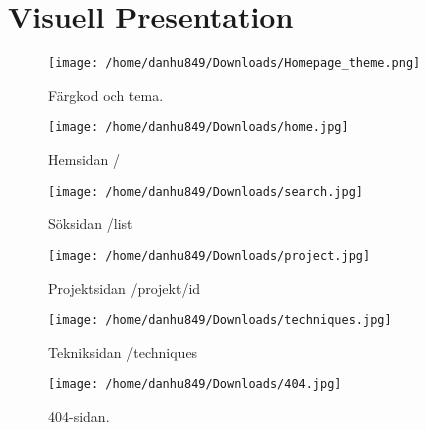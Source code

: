 \documentclass{TDP003mall}
\begin{document}
\newpage

\section{Visuell Presentation}
\begin{figure}[h]
  \centerline{\texttt{[image: /home/danhu849/Downloads/Homepage\_theme.png]}}
  \caption{Färgkod och tema.}
  \label{fig}
\end{figure}

\begin{figure}[h]
  \centerline{\texttt{[image: /home/danhu849/Downloads/home.jpg]}}
  \caption{Hemsidan /}
  \label{fig}
\end{figure}

\begin{figure}[h]
  \centerline{\texttt{[image: /home/danhu849/Downloads/search.jpg]}}
  \caption{Söksidan /list}
  \label{fig}
\end{figure}

\begin{figure}[h]
  \centerline{\texttt{[image: /home/danhu849/Downloads/project.jpg]}}
  \caption{Projektsidan /projekt/id}
  \label{fig}
\end{figure}

\begin{figure}[h]
  \centerline{\texttt{[image: /home/danhu849/Downloads/techniques.jpg]}}
  \caption{Tekniksidan /techniques}
  \label{fig}
\end{figure}

\begin{figure}[h]
  \centerline{\texttt{[image: /home/danhu849/Downloads/404.jpg]}}
  \caption{404-sidan.}
  \label{fig}
\end{figure}
\end{document}
